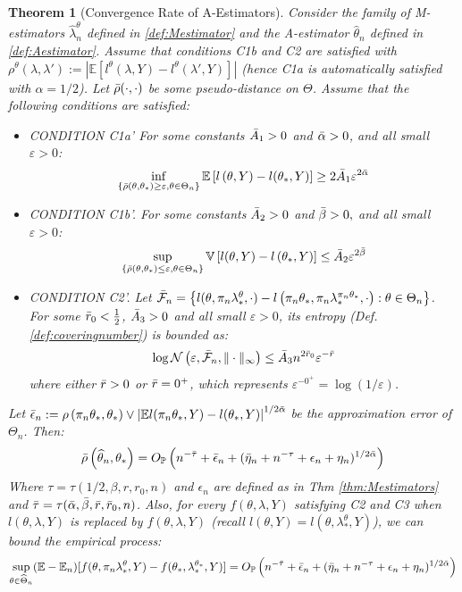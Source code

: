 \documentclass[12pt]{article}
\theoremstyle{myplain}
\newtheorem{theorem}{Theorem}[section]
\theoremstyle{definition}
\theoremstyle{definition}
\theoremstyle{remark}
\numberwithin{equation}{section}
\begin{document}
\begin{theorem}[Convergence Rate of A-Estimators]\label{thm:Aestimators} Consider the family of  M-estimators $\widehat{\lambda}_n^\theta$ defined in \ref{def:Mestimator} and the A-estimator $\widehat{\theta}_{n}$ defined in \ref{def:Aestimator}. Assume that conditions C1b and C2 are satisfied with $\rho^\theta(\lambda, \lambda'):=\left|\mathbb{E}[l^\theta(\lambda, Y)-l^\theta(\lambda', Y)]\right|$ (hence C1a is automatically satisfied with $\alpha=1/2$). Let $\Bar\rho(\cdot, \cdot)$ be some pseudo-distance on $\Theta$. Assume that the following conditions are satisfied:

\begin{itemize}
\item[] CONDITION C1a' For some constants $\Bar A_{1}>0$ and $\Bar \alpha>0$, and all small $\varepsilon>0$: $$\inf_{\{\Bar\rho\left(\theta, \theta_*\right) \geq \varepsilon, \theta\in\Theta_n\}} \mathbb{E}\left[l\left(\theta, Y\right)-l(\theta_*, Y)\right] \geq 2 \Bar A_{1} \varepsilon^{2 \Bar \alpha} $$
\item[] CONDITION C1b'. For some constants $\Bar A_{2}>0$ and $\Bar \beta>0,$ and all small $\varepsilon>0$: $$\sup _{\left\{\Bar\rho\left(\theta, \theta_*\right) \leq \varepsilon,\theta\in\Theta_n\right\}} \mathbb{V}\left[l(\theta, Y)-l\left(\theta_*, Y\right)\right] \leq  \Bar A_{2} \varepsilon^{2\Bar  \beta} $$
\item[] CONDITION C2'. Let $\Bar{\mathcal{F}}_{n}=\left\{l(\theta, \pi_{n} \lambda_*^\theta, \cdot)-l\left(\pi_n \theta_*, \pi_{n} \lambda_*^{\pi_n \theta_*}, \cdot\right): \theta\in\Theta_n\right\}$. For some $\Bar r_0<\frac{1}{2}$, $\Bar A_{3}>0$ and all small $\varepsilon>0$, its entropy (Def. \ref{def:coveringnumber}) is bounded as:
\[\log\mathcal{N}\left(\varepsilon,\Bar{\mathcal{F}}_{n}, \|\cdot\|_\infty\right) \leq\Bar  A_{3} n^{2 \Bar r_0} \varepsilon^{-\Bar r}\] where either $\Bar r>0$ or $\Bar r=0^+$, which represents $\varepsilon^{-0^+}=\log(1/\varepsilon)$.
\end{itemize}
Let $\Bar \epsilon_n :=\rho\left(\pi_{n} \theta_*, \theta_*\right) \vee \left|\mathbb{E}l(\pi_{n} \theta_*,Y) -l(\theta_*, Y)\right|^{1/2\Bar\alpha}$ be the approximation error of $\Theta_n$. Then:
$$\Bar\rho\left(\widehat{\theta}_{n}, \theta_*\right)=O_{\mathbb{P}}\left(n^{-\Bar \tau} + \Bar \epsilon_n + (\Bar \eta_n + n^{-\tau} + \epsilon_n + \eta_{n})^{1/2\Bar\alpha}\right)$$
Where $\tau=\tau(1/2, \beta, r, r_0, n)$ and $\epsilon_n$ are defined as in Thm \ref{thm:Mestimators} and $\Bar\tau=\tau(\Bar\alpha, \Bar\beta, \Bar r, \Bar r_0, n)$. Also, for every $f(\theta,\lambda, Y)$ satisfying  C2 and C3 when $l(\theta, \lambda, Y)$ is replaced by $f(\theta, \lambda, Y)$ (recall $l(\theta, Y)=l(\theta, \lambda_*^\theta, Y)$), we can bound the empirical process:
$$
\sup_{\theta\in\widehat{\Theta}_n} (\mathbb{E}-\mathbb{E}_n)[f(\theta, \pi_n\lambda_*^{\theta}, Y)-f(\theta_*, \lambda_*^{\theta_*}, Y)] = O_{\mathbb{P}}\left(n^{-\Bar \tau} + \Bar \epsilon_n + (\Bar \eta_n + n^{-\tau} + \epsilon_n + \eta_{n})^{1/2\Bar\alpha}\right)
$$
\end{theorem}
\end{document}
